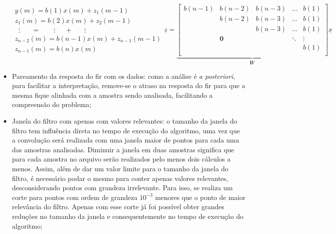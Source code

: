 \begin{itemize}
\begin{subequations}
\begin{eqnarray}\label{eq:y_m_fir}
y(m) = b(1)x(m)+z_1(m-1)  \nonumber \\
z_1(m) = b(2)x(m)+z_2(m-1)  \nonumber \\
\;\;\vdots\;\;\;\;\;\; =
\;\;\;\;\;\;\;\vdots\;\;\;\;\;+\;\;\;\;\;\;\vdots\;\;\;\;\;\;\;  \\
z_{n-2}(m) = b(n-1)x(m)+z_{n-1}(m-1)  \nonumber \\
z_{n-1}(m) = b(n)x(m) \nonumber
\end{eqnarray}
\begin{equation} \label{eq:matrix_fir}
\underline{z} = 
\underbrace{\begin{bmatrix}
b(n-1) & b(n-2)   & b(n-3) & \dots & b(1) \\
       & b(n-2)   & b(n-3) & \dots & b(1) \\
       &          & b(n-3) & \dots & b(1) \\
       &\mathbf{0}&        & \ddots & \vdots \\
       &          &        &        & b(1) \\
\end{bmatrix}}_{\mathbf{B}'}\underline{x}
\end{equation}
\end{subequations}

\item Pareamento da resposta do \acs{fir} com os dados: como a análise
é \emph{a posteriori}, para facilitar a interpretação, remove-se o
atraso na resposta do \acs{fir} para que a mesma fique alinhada com a
amostra sendo analisada, facilitando a compreensão do problema;

\item Janela do filtro com apenas com valores relevantes: o tamanho da
janela do filtro tem influência direta no tempo de execução do
algoritmo, uma vez que a convolução será realizada com uma janela
maior de pontos para cada uma das amostras analisadas. Diminuir a
janela em duas amostras significa que para cada amostra no arquivo
serão realizados pelo menos dois cálculos a menos. Assim, além de dar
um valor limite para o tamanho da janela do filtro, é necessário podar
o mesmo para conter apenas valores relevantes, desconsiderando pontos
com grandeza irrelevante. Para isso, se realiza um corte para pontos
com ordem de grandeza $10^{-3}$ menores que o ponto de maior
relevância do filtro. Apenas com esse corte já foi possível obter
grandes reduções no tamanho da janela e consequentemente no tempo de
execução do algoritmo;


\end{itemize}
